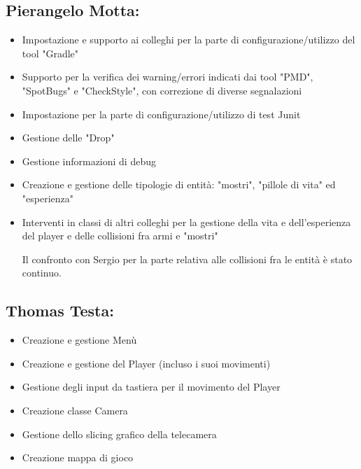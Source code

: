 \documentclass[a4paper,12pt]{report}
\begin{document}
\paragraph{}

\subsection*{Pierangelo Motta:}
\begin{itemize}
	\item Impostazione e supporto ai colleghi per la parte di configurazione/utilizzo del tool "Gradle"
	\item Supporto per la verifica dei warning/errori indicati dai tool "PMD", "SpotBugs" e "CheckStyle", con correzione di diverse segnalazioni 
	\item Impostazione per la parte di configurazione/utilizzo di test Junit
	\item Gestione delle "Drop"
	\item Gestione informazioni di debug
	\item Creazione e gestione delle tipologie di entità: "mostri", "pillole di vita" ed "esperienza"
	\item Interventi in classi di altri colleghi per la gestione della vita e dell'esperienza del player e delle collisioni fra armi e "mostri"
	
	Il confronto con Sergio per la parte relativa alle collisioni fra le entità è stato continuo.

\end{itemize}
\subsection*{Thomas Testa:}
\begin{itemize}
	\item Creazione e gestione Menù 
    \item Creazione e gestione del Player (incluso i suoi movimenti)
	\item Gestione degli input da tastiera per il movimento del Player 
    \item Creazione classe Camera
    \item Gestione dello slicing grafico della telecamera
    \item Creazione mappa di gioco
\end{itemize}

\paragraph{}
\end{document}
